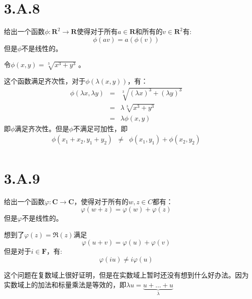 \documentclass[10pt,a4paper,UTF8]{article}
\begin{document}
\section{3.A.8}
\label{sec:orgc976621}


\begin{problem}
给出一个函数\(\phi: \mathbf{R}^{2} \rightarrow \mathbf{R}\)使得对于所有\(a\in \mathbf{R}\)和所有的\(v\in \mathbf{R}^{2}\)有:
\begin{equation}
\label{eq:11}
\phi(av) = a(\phi(v))
\end{equation}
但是\(\phi\)不是线性的。
\end{problem}

\begin{answer}
令\(\phi(x,y) = \sqrt[3]{x^{3} + y^{3}}\) 。

这个函数满足齐次性，对于\(\phi(\lambda(x,y))\)，有：
\begin{eqnarray*}
\phi(\lambda x,\lambda y) &=& \sqrt[3]{(\lambda x)^{3} + (\lambda y)^{3}}  \\
&=& \lambda  \sqrt[3]{x^{3} + y^{3}}  \\ 
&=& \lambda \phi (x,y)
\end{eqnarray*}
即\(\phi\)满足齐次性。但是\(\phi\)不满足可加性，即
\begin{eqnarray*}
\phi(x_{1}+x_{2},y_{1}+y_{2})&\neq& \phi(x_{1},y_{1}) + \phi(x_{2},y_{2}) \\
\end{eqnarray*}
\end{answer}

\section{3.A.9}
\label{sec:org6b19e69}


\begin{problem}
给出一个函数\(\varphi: \mathbf{C}\rightarrow \mathbf{C}\)，使得对于所有的\(w,z\in C\)都有：
\begin{equation}
\label{eq:13}
\varphi(w+z) = \varphi(w) + \varphi(z)
\end{equation}
但是\(\varphi\)不是线性的。
\end{problem}

\begin{answer}
想到了\(\varphi(z) = \Re(z)\)满足
\begin{equation}
\label{eq:14}
\varphi(u+v) = \varphi(u) + \varphi(v)
\end{equation}
但是对于\(i\in \mathbf{F}\)，有:
\begin{equation}
\label{eq:15}
\varphi(i u) \neq i\varphi(u)
\end{equation}

这个问题在复数域上很好证明，但是在实数域上暂时还没有想到什么好办法。因为实数域上的加法和标量乘法是等效的，即\(\lambda u = \underbrace{u+\ldots +u}_{\lambda}\)
\end{answer}
\end{document}
